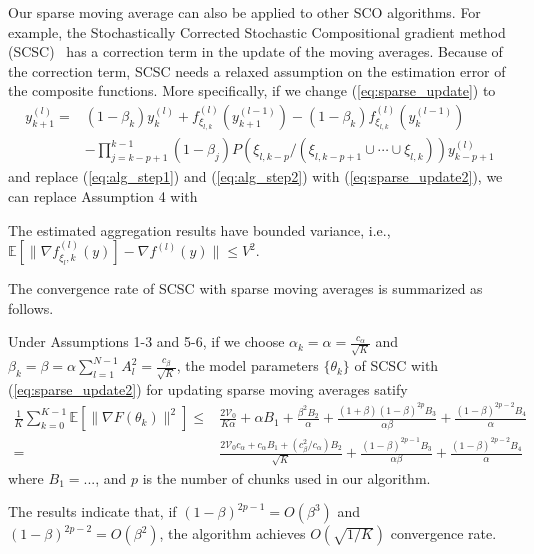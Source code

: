 Our sparse moving average can also be applied to other SCO algorithms. For example, the Stochastically Corrected Stochastic Compositional gradient method (SCSC)~\cite{chen2020solving} has a correction term in the update of the moving averages. 
Because of the correction term, SCSC needs a relaxed assumption on the estimation error of the composite functions. 
More specifically, if we change (\ref{eq:sparse_update}) to 
\begin{equation}
  \label{eq:sparse_update2}
  \begin{split}
    y^{(l)}_{k+1} = &(1-\beta_{k})y^{(l)}_k + f^{(l)}_{\xi_{l,k}}(y^{(l-1)}_{k+1}) - (1-\beta_k)f^{(l)}_{\xi_{l,k}}(y^{(l-1)}_{k})\\
             &-\prod_{j=k-p+1}^{k-1}(1-\beta_j)P(\xi_{l, {k-p}}/(\xi_{l,{k-p+1}}\cup\cdots \cup\xi_{l,k}))y^{(l)}_{k-p+1}
  \end{split}
\end{equation}
and replace (\ref{eq:alg_step1}) and (\ref{eq:alg_step2}) with (\ref{eq:sparse_update2}), we can replace Assumption 4 with
\begin{assumption}
  The estimated aggregation results have bounded variance, i.e., $\mathbb{E}[\|\nabla f^{(l)}_{\xi_l, k}(y)] - \nabla f^{(l)}(y)\|\leq V^2$. 
\end{assumption}
The convergence rate of SCSC with sparse moving averages is summarized as follows. 
\begin{theorem}
  Under Assumptions 1-3 and 5-6, if we choose $\alpha_k=\alpha=\frac{c_\alpha}{\sqrt{K}}$ and $\beta_k=\beta={\alpha}\sum_{l=1}^{N-1}A_l^2=\frac{c_{\beta}}{\sqrt{K}}$, the model parameters $\{\theta_k\}$ of SCSC with (\ref{eq:sparse_update2}) for updating sparse moving averages satify
\begin{equation}
  \label{eq:th2}
  \begin{split}
  \frac{1}{K}\sum_{k=0}^{K-1}\mathbb{E}[\|\nabla F(\theta_k)\|^2] \leq&  \frac{2\mathcal{V}_0}{K\alpha} + \alpha B_1 + \frac{\beta^2 B_2}{\alpha} + \frac{(1+\beta)(1-\beta)^{2p}B_3}{\alpha\beta} + \frac{(1-\beta)^{2p-2}B_4}{\alpha}\\
= &\frac{2\mathcal{V}_0c_{\alpha}+c_{\alpha} B_1 + (c_{\beta}^2/c_\alpha)B_2}{\sqrt{K}}  + \frac{(1-\beta)^{2p-1}B_3}{\alpha\beta} + \frac{(1-\beta)^{2p-2}B_4}{\alpha}
  \end{split}
\end{equation}
where $B_1=...$, and $p$ is the number of chunks used in our algorithm. 
\end{theorem}
The results indicate that, if $(1-\beta)^{2p-1}=O(\beta^3)$ and $(1-\beta)^{2p-2}=O(\beta^2)$, the algorithm achieves $O(\sqrt{1/K})$ convergence rate. 


















